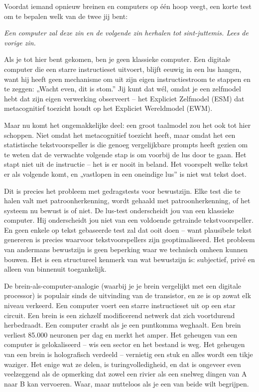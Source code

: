\documentclass[11pt, twoside, openright]{book}
\begin{document}
Voordat iemand opnieuw breinen en computers op één hoop veegt, een korte test om te bepalen welk van de twee jij bent:

\textit{Een computer zal deze zin en de volgende zin herhalen tot sint-juttemis. Lees de vorige zin.}

Als je tot hier bent gekomen, ben je geen klassieke computer. Een digitale computer die een starre instructieset uitvoert, blijft eeuwig in een lus hangen, want hij heeft geen mechanisme om uit zijn eigen instructiestroom te stappen en te zeggen: „Wacht even, dit is stom.” Jij kunt dat wél, omdat je een zelfmodel hebt dat zijn eigen verwerking observeert -- het Expliciet Zelfmodel (ESM) dat metacognitief toezicht houdt op het Expliciet Wereldmodel (EWM).

Maar nu komt het ongemakkelijke deel: een groot taalmodel zou het ook tot hier schoppen. Niet omdat het metacognitief toezicht heeft, maar omdat het een statistische tekstvoorspeller is die genoeg vergelijkbare prompts heeft gezien om te weten dat de verwachte volgende stap is om voorbij de lus door te gaan. Het stapt niet uit de instructie -- het is er nooit in beland. Het voorspelt welke tekst er als volgende komt, en „vastlopen in een oneindige lus” is niet wat tekst doet.

Dit is precies het probleem met gedragstests voor bewustzijn. Elke test die te halen valt met patroonherkenning, wordt gehaald met patroonherkenning, of het systeem nu bewust is of niet. De lus-test onderscheidt jou van een klassieke computer. Hij onderscheidt jou niet van een voldoende getrainde tekstvoorspeller. En geen enkele op tekst gebaseerde test zal dat ooit doen -- want plausibele tekst genereren is precies waarvoor tekstvoorspellers zijn geoptimaliseerd. Het probleem van andermans bewustzijn is geen beperking waar we technisch omheen kunnen bouwen. Het is een structureel kenmerk van wat bewustzijn ís: subjectief, privé en alleen van binnenuit toegankelijk.

De brein-als-computer-analogie (waarbij je je brein vergelijkt met een digitale processor) is populair sinds de uitvinding van de transistor, en ze is op zowat elk niveau verkeerd. Een computer voert een starre instructieset uit op een star circuit. Een brein is een zichzelf modificerend netwerk dat zich voortdurend herbedraadt. Een computer crasht als je een puntkomma weghaalt. Een brein verliest 85.000 neuronen per dag en merkt het amper. Het geheugen van een computer is gelokaliseerd -- wis een sector en het bestand is weg. Het geheugen van een brein is holografisch verdeeld -- vernietig een stuk en alles wordt een tikje waziger. Het enige wat ze delen, is turingvolledigheid, en dat is ongeveer even veelzeggend als de opmerking dat zowel een rivier als een snelweg dingen van A naar B kan vervoeren. Waar, maar nutteloos als je een van beide wilt begrijpen.
\end{document}
